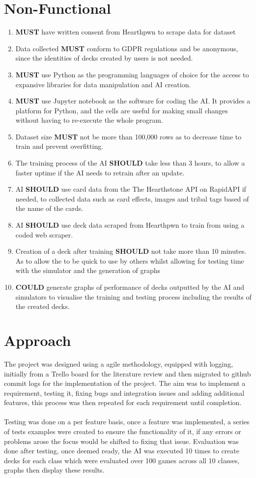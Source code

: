 \documentclass{report} %
\begin{document}
	\section{Non-Functional}
	\begin{enumerate}
		\item \textbf{MUST} have written consent from Hearthpwn to scrape data for dataset
		\item Data collected \textbf{MUST} conform to GDPR regulations and be anonymous, since the identities of decks created by users is not needed.
		\item \textbf{MUST} use Python as the programming languages of choice for the access to expansive libraries for data manipulation and AI creation.
		\item \textbf{MUST} use Jupyter notebook as the software for coding the AI. It provides a platform for Python, and the cells are useful for making small changes without having to re-execute the whole program.
		\item Dataset size \textbf{MUST} not be more than 100,000 rows as to decrease time to train and prevent overfitting.
		\item The training process of the AI \textbf{SHOULD} take less than 3 hours, to allow a faster uptime if the AI needs to retrain after an update.
		\item AI \textbf{SHOULD} use card data from the The Hearthstone API on RapidAPI if needed, to collected data such as card effects, images and tribal tags based of the name of the cards.
		\item AI \textbf{SHOULD} use deck data scraped from Hearthpwn to train from using a coded web scraper.
		\item Creation of a deck after training \textbf{SHOULD} not take more than 10 minutes. As to allow the to be quick to use by others whilst allowing for testing time with the simulator and the generation of graphs
		\item \textbf{COULD} generate graphs of performance of decks outputted by the AI and simulators to visualise the training and testing process including the results of the created decks. 
	\end{enumerate}
	\section{Approach}
	The project was designed using a agile methodology, equipped with logging, initially from a Trello board for the literature review and then migrated to github commit logs for the implementation of the project. The aim was to implement a requirement, testing it, fixing bugs and integration issues and adding additional features, this process was then repeated for each requirement until completion. \\ \\
	Testing was done on a per feature basis, once a feature was implemented, a series of tests examples were created to ensure the functionality of it, if any errors or problems arose the focus would be shifted to fixing that issue. Evaluation was done after testing, once deemed ready, the AI was executed 10 times to create decks for each class which were evaluated over 100 games across all 10 classes, graphs then display these results.
\end{document}
